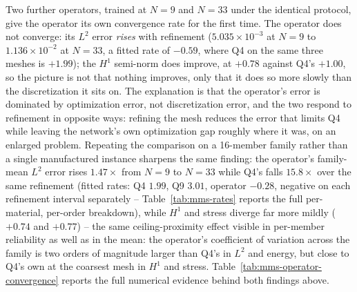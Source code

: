 \documentclass[final,5p,times]{elsarticle}
\begin{document}
Two further operators, trained at $N{=}9$ and $N{=}33$ under the identical
protocol, give the operator its own convergence rate for the first time.
The operator does not converge: its $L^2$ error \emph{rises} with
refinement ($5.035\times10^{-3}$ at $N{=}9$ to $1.136\times10^{-2}$ at
$N{=}33$, a fitted rate of $-0.59$, where Q4 on the same three meshes is
$+1.99$); the $H^1$ semi-norm does improve, at $+0.78$ against Q4's
$+1.00$, so the picture is not that nothing improves, only that it does
so more slowly than the discretization it sits on. The explanation is
that the operator's error is dominated by optimization error, not
discretization error, and the two respond to refinement in opposite
ways: refining the mesh reduces the error that limits Q4 while leaving
the network's own optimization gap roughly where it was, on an enlarged
problem. Repeating the comparison on a 16-member family rather than a
single manufactured instance sharpens the same finding: the operator's
family-mean $L^2$ error rises $1.47\times$ from $N{=}9$ to $N{=}33$ while
Q4's falls $15.8\times$ over the same refinement (fitted rates: Q4
$1.99$, Q9 $3.01$, operator $-0.28$, negative on each refinement interval
separately -- Table~\ref{tab:mms-rates} reports the full per-material,
per-order breakdown), while $H^1$ and stress diverge far more mildly ($+0.74$ and
$+0.77$) -- the same ceiling-proximity effect visible in per-member
reliability as well as in the mean: the operator's coefficient of
variation across the family is two orders of magnitude larger than Q4's
in $L^2$ and energy, but close to Q4's own at the coarsest mesh in $H^1$
and stress. Table~\ref{tab:mms-operator-convergence} reports the full
numerical evidence behind both findings above.
\end{document}
